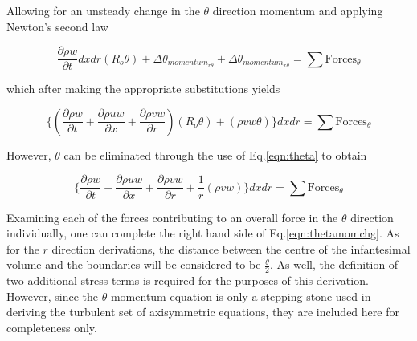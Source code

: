 	Allowing for an unsteady change in the $\theta$ direction momentum and applying Newton's second law

\begin{displaymath}
	\frac{\partial \rho w}{\partial t}dxdr(R_o \theta) + \Delta \theta_{momentum_{r \theta}} + \Delta \theta_{momentum_{x \theta}} = 
	\sum \textrm{Forces}_\theta
\end{displaymath}

	which after making the appropriate substitutions yields

\begin{displaymath}
	\Big\{(\frac{\partial \rho w}{\partial t} + \frac{\partial \rho uw}{\partial x} +
	\frac{\partial \rho vw}{\partial r})(R_o \theta) + (\rho vw \theta)\Big\}dxdr = \sum \textrm{Forces}_\theta
\end{displaymath}

	However, $\theta$ can be eliminated through the use of Eq.\ref{eqn:theta} to obtain

\begin{equation}
	\Big\{\frac{\partial \rho w}{\partial t} + \frac{\partial \rho uw}{\partial x} +
	\frac{\partial \rho vw}{\partial r} + \frac{1}{r}(\rho vw)\Big\}dxdr = \sum \textrm{Forces}_\theta
\label{eqn:thetamomchg}
\end{equation}

	Examining each of the forces contributing to an overall force in the $\theta$ direction individually, one 
can complete the right hand side of Eq.\ref{eqn:thetamomchg}.  As for the $r$ direction derivations, the distance
between the centre of the infantesimal volume and the boundaries will be considered to be $\frac{\theta}{2}$.
As well, the definition of two additional stress terms is required for the purposes of this derivation.  However, 
since the $\theta$ momentum equation is only a stepping stone used in deriving the turbulent set of axisymmetric 
equations, they are included here for completeness only.

